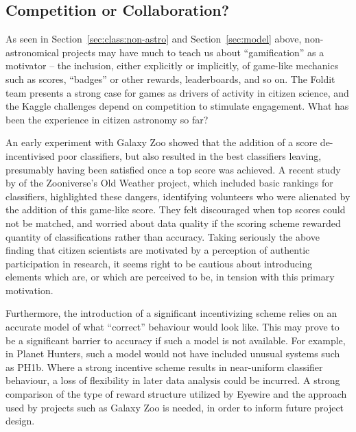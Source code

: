 \documentclass{ar2e}
\def\Sref#1{Section~\ref{#1}\xspace}
\begin{document}

\subsection{Competition or Collaboration?}
\label{sec:crowd:gamification}

As seen in \Sref{sec:class:non-astro} and \Sref{sec:model}  above,
non-astronomical projects may have much to teach us about ``gamification'' as a
motivator -- the inclusion, either explicitly or implicitly, of game-like
mechanics such as scores, ``badges'' or other rewards, leaderboards, and so on.
The Foldit team presents a strong case for games as drivers of activity in
citizen science, and the Kaggle challenges depend on competition to stimulate
engagement. What has been the experience in citizen astronomy so far?

An early experiment with Galaxy Zoo showed that the addition of a score
de-incentivised poor classifiers, but also resulted in the best classifiers
leaving, presumably having been satisfied once a top score was achieved. A
recent study by \citet{Eveleigh++2013} of the Zooniverse's Old Weather
project, which included basic rankings for classifiers, highlighted these
dangers, identifying volunteers who were alienated by the addition of this
game-like score. They felt discouraged when top scores could not be matched, and
worried about data quality if the scoring scheme rewarded quantity of
classifications rather than accuracy. Taking seriously the above finding  that
citizen scientists are motivated by a perception of authentic participation in
research, it seems right to be cautious about introducing elements which are, or
which are perceived to be, in tension with this primary motivation. 

Furthermore, the introduction of a significant incentivizing scheme relies on an
accurate model of what ``correct'' behaviour would look like. This may prove to
be a significant barrier to accuracy if such a model is not available. For
example, in Planet Hunters, such a model would not have included unusual systems
such as PH1b. Where a strong incentive scheme results in near-uniform classifier
behaviour, a loss of flexibility in later data analysis could be incurred.  A
strong comparison of the type of reward structure utilized by Eyewire and the
approach used by projects such as Galaxy Zoo is needed, in order to inform
future project design. 
\end{document}
